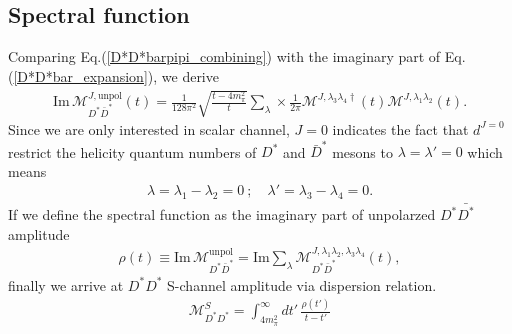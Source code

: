 \documentclass[aps,prd,preprintnumbers,showpacs,showkeys,nofootinbib,
superscriptaddress,fleqn,floatfix,tightenlines, 10pt]{revtex4-1}
\begin{document}
\subsection{Spectral function}
Comparing Eq.(\ref{D*D*barpipi_combining}) with the imaginary part of
Eq.(\ref{D*D*bar_expansion}), we derive
\begin{align} \label{Cutkosky}
	\mathrm{Im}\,\mathcal{M}_{D^*\bar{D}^*}^{J,\mathrm{unpol}}(t)
	= \frac{1}{128\pi^2} \sqrt{\frac{t-4m_\pi^2}{t}} \sum_\lambda\times
	\frac{1}{2\pi} \mathcal{M}^{J,\lambda_3 \lambda_4 \dagger}(t)
	\mathcal{M}^{J,\lambda_1 \lambda_2}(t).
\end{align}
Since we are only interested in scalar channel, $J=0$ indicates the fact that
$d^{J=0}$ restrict the helicity quantum numbers of $D^*$ and $\bar{D}^*$ mesons
to $\lambda=\lambda' =0$ which means
\begin{align} \label{helicity_restriction}
	\lambda=\lambda_1-\lambda_2=0\ ; \quad \lambda'=\lambda_3-\lambda_4=0.
\end{align}
If we define the spectral function as the imaginary part of unpolarzed $D^*\bar{D^*}$
amplitude
\begin{align} \label{definition_spectralfunction}
	\rho(t) \equiv \mathrm{Im}\,\mathcal{M}_{D^*\bar{D}^*}^\mathrm{unpol}
	= \mathrm{Im}\sum_{\lambda}
	\mathcal{M}_{D^*\bar{D}^*}^{J,\lambda_1\lambda_2,\lambda_3\lambda_4}(t),
\end{align}
finally we arrive at $D^*D^*$ S-channel amplitude via dispersion relation.
\begin{align} \label{D^*D^*S_amplitude}
	\mathcal{M}_{D^*D^*}^S = \int_{4m_\pi^2}^\infty
	dt'\,\frac{\rho(t')}{t-t'}
\end{align}
\end{document}
